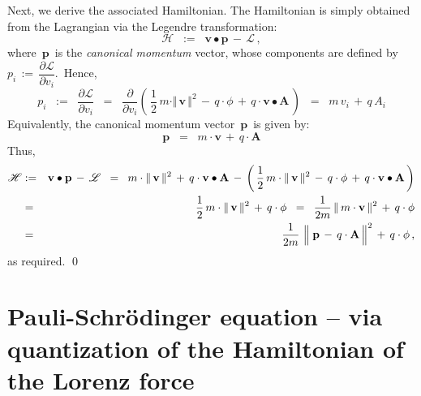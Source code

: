\vskip 0.3cm
\noindent
Next, we derive the associated Hamiltonian.
The Hamiltonian is simply obtained from the Lagrangian via the Legendre transformation:
\begin{equation*}
\mathscr{H}
\;\; := \;\;
    \mathbf{v} \bullet \mathbf{p}
    \, - \,
    \mathscr{L}\,,
\end{equation*}
where
\,$\mathbf{p}$\,
is the \textit{canonical momentum} vector, whose components are defined by
\,$p_{i} \,:=\, \dfrac{\partial\mathscr{L}}{\partial v_{i}}$.\,
Hence,
\begin{equation*}
p_{i}
\;\; := \;\;
    \dfrac{\partial\mathscr{L}}{\partial v_{i}}
\;\; = \;\;
    \dfrac{\partial}{\partial v_{i}}\!
    \left(\,
        \dfrac{1}{2}\,m\cdot\Vert\,\mathbf{v}\,\Vert^2
        \, - \,
        q\cdot\phi
        \, + \,
        q\cdot\mathbf{v} \bullet \mathbf{A}
        \,\right)
\;\; = \;\;
    m\,v_{i}
    \, + \,
    q\,A_{i}
\end{equation*}
Equivalently, the canonical momentum vector \,$\mathbf{p}$\, is given by:
\begin{equation*}
\mathbf{p}
\;\; = \;\;
    m\cdot\mathbf{v}
    \, + \,
    q\cdot\mathbf{A}
\end{equation*}
Thus,
\begin{eqnarray*}
\mathscr{H}
& := &
    \mathbf{v} \bullet \mathbf{p}
    \, - \,
    \mathscr{L}
\;\; = \;\;
    m\cdot\Vert\,\mathbf{v}\,\Vert^{2}
    \, + \,
    q\cdot\mathbf{v} \bullet \mathbf{A}
    \, - \,
    \left(\,
        \dfrac{1}{2}\,m\cdot\Vert\,\mathbf{v}\,\Vert^2
        \, - \,
        q\cdot\phi
        \, + \,
        q\cdot\mathbf{v} \bullet \mathbf{A}
        \,\right)
\\
& = &
    \dfrac{1}{2}\,m\cdot\Vert\,\mathbf{v}\,\Vert^2
    \, + \,
    q\cdot\phi
\;\; = \;\;
    \dfrac{1}{2m}\,\Vert\,m\cdot\mathbf{v}\,\Vert^{2}
    \, + \,
    q\cdot\phi
\\
& = &
    \dfrac{1}{2m}\,\left\Vert\;
        \mathbf{p}
        \, \overset{{\color{white}.}}{-} \,
        q\cdot\mathbf{A}
        \,\right\Vert^{2}
    \, + \,
    q\cdot\phi\,,
\end{eqnarray*}
as required.
\qed


\vskip 0.5cm
\section{Pauli-Schr\"odinger equation -- via quantization of the Hamiltonian of the Lorenz force}

